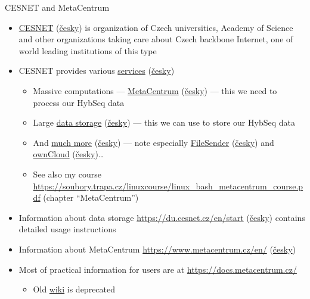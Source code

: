 \documentclass[compress, ucs, xelatex, 11pt, xcolor=x11names, aspectratio=169,
	hyperref={
		bookmarks=true,
		unicode=true,
		colorlinks=true,
		pdftitle={HybSeq course},
		plainpages=false,
		pdfauthor={Vojtech Zeisek},
		pdfsubject={Practical processing of HybSeq target enrichment sequencing data on computing grids like MetaCentrum},
		pdfcreator={XeLaTeX},
		pdfkeywords={BASH, command line, GNU, HybSeq, Linux, MetaCentrum, sequencing shell, target enrichment},
		linkcolor=Turquoise4, %
		anchorcolor=DodgerBlue4, %
		citecolor=DodgerBlue4, %
		filecolor=DodgerBlue4, %
		menucolor=Tan4, %
		urlcolor=DarkOliveGreen4, %
		pdftex},
	url={hyphens, lowtilde} %
	]{beamer}
\renewcommand{\alert}[1]{\textcolor{OrangeRed3}{#1}}
\begin{document}
\begin{frame}[allowframebreaks]{CESNET and MetaCentrum}
	\label{CESNET}
	\begin{itemize}
		\item \href{https://www.cesnet.cz/?lang=en}{CESNET} (\href{https://www.cesnet.cz/}{česky}) is organization of Czech universities, Academy of Science and other organizations taking care about Czech backbone Internet, one of world leading institutions of this type
		\item CESNET provides various \href{https://www.cesnet.cz/services/?lang=en}{services} (\href{https://www.cesnet.cz/sluzby/}{česky})
		\begin{itemize}
			\item Massive computations --- \href{https://www.cesnet.cz/services/massive-computations-metacentrum/?lang=en}{MetaCentrum} (\href{https://www.cesnet.cz/sluzby/metacentrum/}{česky}) --- \alert{this we need to process our HybSeq data}
			\item Large \href{https://www.cesnet.cz/services/data-storage/?lang=en}{data storage} (\href{https://www.cesnet.cz/sluzby/datova-uloziste/}{česky}) --- \alert{this we can use to store our HybSeq data}
			\item And \href{https://www.cesnet.cz/services/?lang=en}{much more} (\href{https://www.cesnet.cz/sluzby/}{česky}) --- note especially \href{https://www.cesnet.cz/services/filesender/?lang=en}{FileSender} (\href{https://www.cesnet.cz/sluzby/filesender/}{česky}) and \href{https://www.cesnet.cz/services/owncloud/?lang=en}{ownCloud} (\href{https://www.cesnet.cz/sluzby/owncloud/}{česky})\ldots
			\item See also my course \url{https://soubory.trapa.cz/linuxcourse/linux_bash_metacentrum_course.pdf} (chapter \enquote{MetaCentrum})
		\end{itemize}
		\item Information about data storage \url{https://du.cesnet.cz/en/start} (\href{https://du.cesnet.cz/cs/start}{česky}) contains detailed usage instructions
		\item Information about MetaCentrum \url{https://www.metacentrum.cz/en/} (\href{https://www.metacentrum.cz/cs/}{česky})
		\item Most of practical information for users are at \url{https://docs.metacentrum.cz/}
		\begin{itemize}
			\item Old \href{https://wiki.metacentrum.cz/}{wiki} is deprecated
		\end{itemize}

\end{itemize}
\end{frame}
\end{document}
